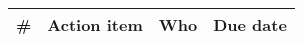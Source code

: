 \begin{longtable}{cXcc}
\toprule
\textbf{\#} & \textbf{Action item} & \textbf{Who}  & \textbf{Due date}

\\ \bottomrule
\end{longtable}
